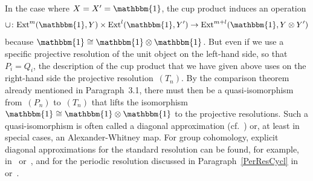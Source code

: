 \documentclass[12pt]{article}
\theoremstyle{definition}
\theoremstyle{break}
\newcommand{\Ext}{\mathrm{Ext}}
\renewcommand{\1}{\mathbbm{1}}
\newcommand{\ot}{\mathbin{\otimes}}
\begin{document}
In the case where $X = X' = \1$, the cup product induces an operation
\[\cup \colon \Ext^m(\1,Y) \times \Ext^l(\1,Y') \to \Ext^{m+l}(\1,Y \ot Y')\]
because $\1 \cong \1 \ot \1$. But even if we use a specific projective resolution of the unit object on the left-hand side, so that $P_i = Q_i$, the description of the cup product that we have given above uses on the right-hand side the projective resolution~$(T_n)$. By the comparison theorem already mentioned in Paragraph~3.1, there must then be a quasi-isomorphism from~$(P_n)$ to~$(T_n)$ that lifts the isomorphism~$\1 \cong \1 \ot \1$ to the projective resolutions. Such a quasi-isomorphism is often called a diagonal approximation (cf.~\cite[Sec.~3.2, p.~57]{Be}) or, at least in special cases, an Alexander-Whitney map. For group cohomology, explicit diagonal approximations for the standard resolution can be found, for example, in~\cite[Sec.~3.4, p.~64]{Be} or~\cite[Sec.~3.2, p.~25]{E}, and for the periodic resolution discussed in Paragraph~\ref{PerResCycl} in~\cite[Sec.~3.5, p.~67]{Be} or~\cite[loc.~cit.]{E}.
\end{document}
